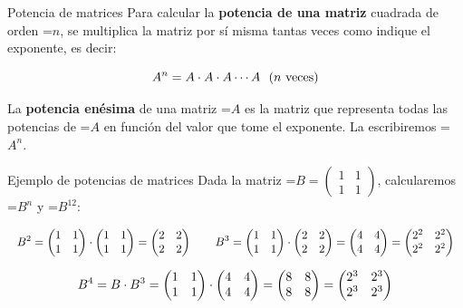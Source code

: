 \documentclass[11pt,a4paper]{article}
\newcommand{\fmm}[1]{\setbox0=\hbox{$#1$}\ifdim\wd0>\linewidth\fmdisp{#1}\else\mbox{\box0}\fi}
\newcommand{\fmdisp}[1]{\[\setbox2=\hbox{$\displaystyle #1$}\ifdim\wd2>\linewidth\resizebox{\linewidth}{!}{\box2}\else\box2\fi\]}
\begin{document}
\begin{fmdef}{Potencia de matrices}
Para calcular la \textbf{potencia de una matriz} cuadrada de orden \fmm{n}, se multiplica la matriz por sí misma tantas veces como indique el exponente, es decir:

\fmdisp{A^n=A\cdot A\cdot A\cdots A\ \ (n\ \text{veces})}

La \textbf{potencia enésima} de una matriz \fmm{A} es la matriz que representa todas las potencias de \fmm{A} en función del valor que tome el exponente. La escribiremos \fmm{A^n}.
\end{fmdef}

\begin{fmex}{Ejemplo de potencias de matrices}
Dada la matriz \fmm{B=\begin{pmatrix}1 & 1\\ 1 & 1\end{pmatrix}}, calcularemos \fmm{B^n} y \fmm{B^{12}}:

\fmdisp{B^2=\begin{pmatrix}1 & 1\\ 1 & 1\end{pmatrix}\cdot\begin{pmatrix}1 & 1\\ 1 & 1\end{pmatrix}=\begin{pmatrix}2 & 2\\ 2 & 2\end{pmatrix}\qquad B^3=\begin{pmatrix}1 & 1\\ 1 & 1\end{pmatrix}\cdot\begin{pmatrix}2 & 2\\ 2 & 2\end{pmatrix}=\begin{pmatrix}4 & 4\\ 4 & 4\end{pmatrix}=\begin{pmatrix}2^2 & 2^2\\ 2^2 & 2^2\end{pmatrix}}

\fmdisp{B^4=B\cdot B^3=\begin{pmatrix}1 & 1\\ 1 & 1\end{pmatrix}\cdot\begin{pmatrix}4 & 4\\ 4 & 4\end{pmatrix}=\begin{pmatrix}8 & 8\\ 8 & 8\end{pmatrix}=\begin{pmatrix}2^3 & 2^3\\ 2^3 & 2^3\end{pmatrix}}


\end{fmex}
\end{document}
